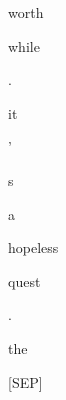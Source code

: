 \documentclass[varwidth=150mm]{standalone}
\begin{document}
\begin{CJK*}{UTF8}{gbsn}
{{{\colorbox{red!0.0}{\strut worth}\colorbox{red!1.1313177347183228}{\strut while} \colorbox{red!0.0}{\strut .} \colorbox{red!4.0831804275512695}{\strut it} \colorbox{red!1.2544240951538086}{\strut '} \colorbox{red!12.034255027770996}{\strut s} \colorbox{red!4.025975704193115}{\strut a} \colorbox{red!0.0}{\strut hopeless} \colorbox{red!1.5361714363098145}{\strut quest} \colorbox{red!1.304606318473816}{\strut .} \colorbox{red!14.992526054382324}{\strut the} \colorbox{red!2.2528445720672607}{\strut [SEP]}
}}}
\end{CJK*}
\end{document}
